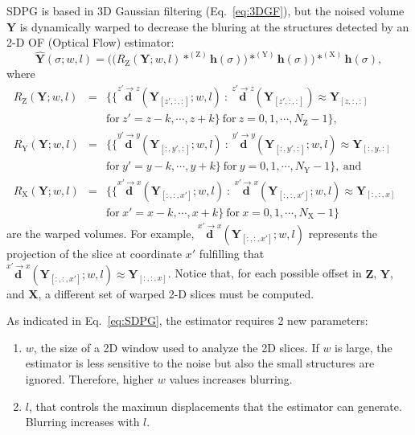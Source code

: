 \documentclass{article}
\begin{document}
SDPG is based in 3D Gaussian filtering (Eq.~\ref{eq:3DGF}), but the noised
volume ${\mathbf Y}$ is dynamically warped to decrease the bluring at the
structures detected by an 2-D OF (Optical Flow) estimator:
\begin{equation}
  \hat{\mathbf{Y}}(\sigma; w, l) = \Big(\big(R_\text{Z}(\mathbf{Y}; w, l)*^{(\text{Z})}{\mathbf h}(\sigma)\big)*^{(\text{Y})}{\mathbf h}(\sigma)\Big)*^{(\text{X})}{\mathbf h}(\sigma),
    \label{eq:SDPG}
\end{equation}
where
\begin{equation*}
    \begin{array}{rclll}
    R_\text{Z}(\mathbf{Y}; w, l) & = & \big\{ \{ \overset{z'\rightarrow z}{\mathbf d}({\mathbf Y}_{[z',:,:]}; w, l)~:~\overset{z'\rightarrow z}{\mathbf d}({\mathbf Y}_{[z',:,:]})\approx{\mathbf Y}_{[z,:,:]} & \\ & & \text{for}
 ~z'=z-k,\cdots,z+k\} ~\text{for}~z=0,1,\cdots,N_\text{Z}-1\big\}, \\
    R_\text{Y}(\mathbf{Y}; w, l) & = & \big\{ \{ \overset{y'\rightarrow y}{\mathbf d}({\mathbf Y}_{[:,y',:]}; w, l)~:~\overset{y'\rightarrow y}{\mathbf d}({\mathbf Y}_{[:,y',:]}; w, l)\approx{\mathbf Y}_{[:,y,:]} & \\ & & \text{for}
 ~y'=y-k,\cdots,y+k\} ~\text{for}~y=0,1,\cdots,N_\text{Y}-1\big\},~\text{and} \\
    R_\text{X}(\mathbf{Y}; w, l) & = & \big\{ \{ \overset{x'\rightarrow x}{\mathbf d}({\mathbf Y}_{[:,:,x']}; w, l)~:~\overset{x'\rightarrow x}{\mathbf d}({\mathbf Y}_{[:,:,x']}; w, l)\approx{\mathbf Y}_{[:,:,x]} & \\ & & \text{for}
 ~x'=x-k,\cdots,x+k\} ~\text{for}~x=0,1,\cdots,N_\text{X}-1\big\}
    \end{array}
\end{equation*}
are the warped volumes. For example,
$\overset{x'\rightarrow x}{\mathbf d}({\mathbf Y}_{[:,:,x']}; w, l)$
represents the projection of the slice at coordinate $x'$ fulfilling
that
$\overset{x'\rightarrow x}{\mathbf d}({\mathbf Y}_{[:,:,x']}; w,
l)\approx{\mathbf Y}_{[:,:,x]}$. Notice that, for each possible offset
in ${\mathbf Z}$, ${\mathbf Y}$, and ${\mathbf X}$, a different set of
warped 2-D slices must be computed.

As indicated in Eq.~\ref{eq:SDPG}, the estimator requires 2 new
parameters:
\begin{enumerate}
\item $w$, the size of a 2D window used to analyze the 2D slices. If
  $w$ is large, the estimator is less sensitive to the noise but also
  the small structures are ignored. Therefore, higher $w$ values
  increases blurring.
\item $l$, that controls the maximun displacements that the
  estimator can generate. Blurring increases with $l$.
\end{enumerate}
\end{document}
